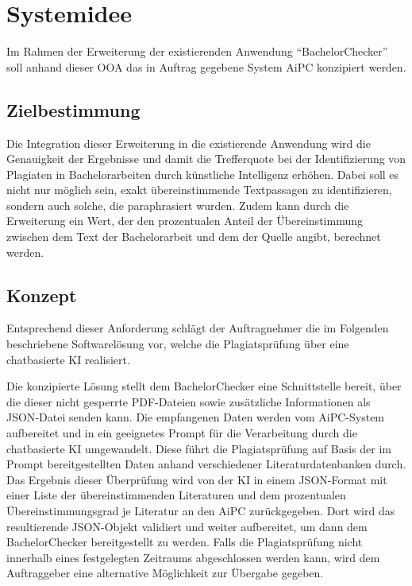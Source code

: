 \chapter{Systemidee}\label{ch:systemidee}

Im Rahmen der Erweiterung der existierenden Anwendung “BachelorChecker” soll anhand dieser \ac{OOA} das in Auftrag gegebene System \ac{AiPC} konzipiert werden.

\section{Zielbestimmung}\label{sec:zielbestimmung}

Die Integration dieser Erweiterung in die existierende Anwendung wird die Genauigkeit der Ergebnisse und damit die Trefferquote bei der Identifizierung von Plagiaten in Bachelorarbeiten durch künstliche Intelligenz erhöhen.
Dabei soll es nicht nur möglich sein, exakt übereinstimmende Textpassagen zu identifizieren, sondern auch solche, die paraphrasiert wurden.
Zudem kann durch die Erweiterung ein Wert, der den prozentualen Anteil der Übereinstimmung zwischen dem Text der Bachelorarbeit und dem der Quelle angibt, berechnet werden.

\section{Konzept}\label{sec:konzept}

Entsprechend dieser Anforderung schlägt der Auftragnehmer die im Folgenden beschriebene Softwarelösung vor, welche die Plagiatsprüfung über eine chatbasierte KI realisiert.

Die konzipierte Lösung stellt dem BachelorChecker eine Schnittstelle bereit, über die dieser nicht gesperrte \ac{PDF}-Dateien sowie zusätzliche Informationen als \ac{JSON}-Datei senden kann.
Die empfangenen Daten werden vom \ac{AiPC}-System aufbereitet und in ein geeignetes Prompt für die Verarbeitung durch die chatbasierte \ac{KI} umgewandelt.
Diese führt die Plagiatsprüfung auf Basis der im Prompt bereitgestellten Daten anhand verschiedener Literaturdatenbanken durch.
Das Ergebnis dieser Überprüfung wird von der \ac{KI} in einem JSON-Format mit einer Liste der übereinstimmenden Literaturen und dem prozentualen Übereinstimmungsgrad je Literatur an den \ac{AiPC} zurückgegeben.
Dort wird das resultierende \ac{JSON}-Objekt validiert und weiter aufbereitet, um dann dem BachelorChecker bereitgestellt zu werden.
Falls die Plagiatsprüfung nicht innerhalb eines festgelegten Zeitraums abgeschlossen werden kann, wird dem Auftraggeber eine alternative Möglichkeit zur Übergabe gegeben.

